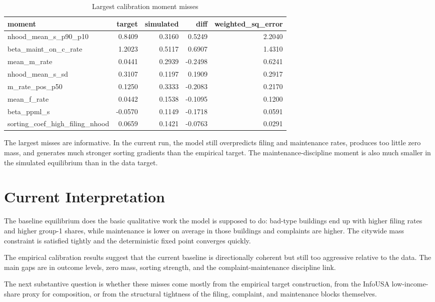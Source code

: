\documentclass[
  11pt,
]{article}
\begin{document}
\begin{table}

\caption{Largest calibration moment misses}
\centering
\begin{tabular}[t]{lrrrr}
\toprule
moment & target & simulated & diff & weighted\_sq\_error\\
\midrule
nhood\_mean\_s\_p90\_p10 & 0.8409 & 0.3160 & 0.5249 & 2.2040\\
beta\_maint\_on\_c\_rate & 1.2023 & 0.5117 & 0.6907 & 1.4310\\
mean\_m\_rate & 0.0441 & 0.2939 & -0.2498 & 0.6241\\
nhood\_mean\_s\_sd & 0.3107 & 0.1197 & 0.1909 & 0.2917\\
m\_rate\_pos\_p50 & 0.1250 & 0.3333 & -0.2083 & 0.2170\\
mean\_f\_rate & 0.0442 & 0.1538 & -0.1095 & 0.1200\\
beta\_ppml\_s & -0.0570 & 0.1149 & -0.1718 & 0.0591\\
sorting\_coef\_high\_filing\_nhood & 0.0659 & 0.1421 & -0.0763 & 0.0291\\
\bottomrule
\end{tabular}
\end{table}

The largest misses are informative. In the current run, the model still
overpredicts filing and maintenance rates, produces too little zero
mass, and generates much stronger sorting gradients than the empirical
target. The maintenance-discipline moment is also much smaller in the
simulated equilibrium than in the data target.

\section{Current Interpretation}\label{current-interpretation}

The baseline equilibrium does the basic qualitative work the model is
supposed to do: bad-type buildings end up with higher filing rates and
higher group-1 shares, while maintenance is lower on average in those
buildings and complaints are higher. The citywide mass constraint is
satisfied tightly and the deterministic fixed point converges quickly.

The empirical calibration results suggest that the current baseline is
directionally coherent but still too aggressive relative to the data.
The main gaps are in outcome levels, zero mass, sorting strength, and
the complaint-maintenance discipline link.

The next substantive question is whether these misses come mostly from
the empirical target construction, from the InfoUSA low-income-share
proxy for composition, or from the structural tightness of the filing,
complaint, and maintenance blocks themselves.
\end{document}
